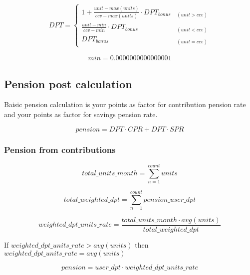 \begin{equation}
DPT = \begin{cases} 
1 + \frac{unit-max(units)} {ccv - max(units)} 
 \cdot DPT_{bonus} & _{(unit > ccv)} \\
\frac{unit - min} {ccv - min} 
 \cdot DPT_{bonus} & _{(unit < ccv)} \\
DPT_{bonus} & _{(unit = ccv)}
\end{cases}
\end{equation}

\begin{eqnarray}
	min = 0.0000000000000001
\end{eqnarray}



\newpage

\subsection{Pension post calculation}

Baisic pension calculation is your points
as factor for contribution pension rate and 
your points as factor for savings pension rate.

\begin{equation}
pension = DPT \cdot CPR + DPT \cdot SPR
\end{equation}

\subsubsection*{Pension from contributions}

\begin{equation}
	total\_units\_month = 
	\sum_{n=1}^{count} units
\end{equation}

\begin{equation}
	total\_weighted\_dpt = 
	\sum_{n=1}^{count} pension\_user\_dpt
\end{equation}

\begin{equation}
	weighted\_dpt\_units\_rate = 	
	\frac{total\_units\_month  \cdot avg(units)} 
	{total\_weighted\_dpt}		
\end{equation}

If $weighted\_dpt\_units\_rate > avg(units)$ then $weighted\_dpt\_units\_rate = avg(units)$
        

\begin{equation}
	pension = 	
	user\_dpt \cdot weighted\_dpt\_units\_rate
\end{equation}


